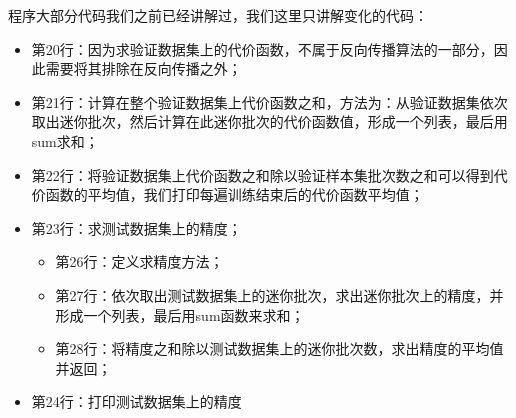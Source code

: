 \documentclass[UTF8]{article}
\begin{document}
程序大部分代码我们之前已经讲解过，我们这里只讲解变化的代码：
\begin{itemize}
\item 第20行：因为求验证数据集上的代价函数，不属于反向传播算法的一部分，因此需要将其排除在反向传播之外；
\item 第21行：计算在整个验证数据集上代价函数之和，方法为：从验证数据集依次取出迷你批次，然后计算在此迷你批次的代价函数值，形成一个列表，最后用sum求和；
\item 第22行：将验证数据集上代价函数之和除以验证样本集批次数之和可以得到代价函数的平均值，我们打印每遍训练结束后的代价函数平均值；
\item 第23行：求测试数据集上的精度；
	\begin{itemize}
	\item 第26行：定义求精度方法；
	\item 第27行：依次取出测试数据集上的迷你批次，求出迷你批次上的精度，并形成一个列表，最后用sum函数来求和；
	\item 第28行：将精度之和除以测试数据集上的迷你批次数，求出精度的平均值并返回；
	\end{itemize}
\item 第24行：打印测试数据集上的精度
\end{itemize}
\end{document}
